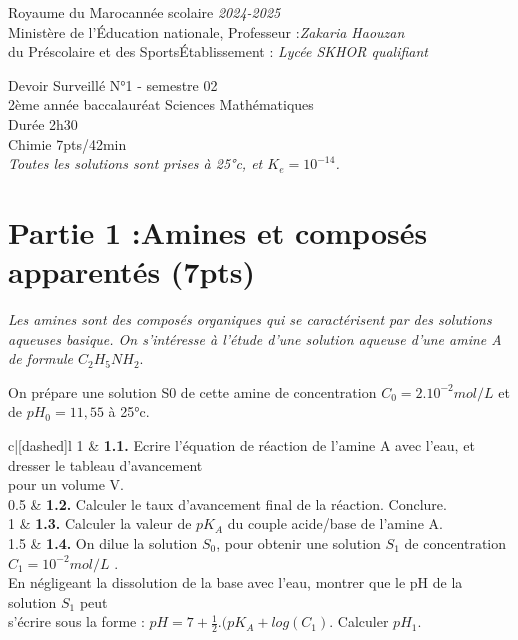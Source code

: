 \documentclass[12pt]{article}
\newcommand\headerMe[2]{\noindent{}#1\hfill#2}
\begin{document}
\headerMe{Royaume du Maroc}{année scolaire \emph{2024-2025}}\\
\headerMe{Ministère de l'Éducation nationale, }{  Professeur :\emph{Zakaria Haouzan}}\\
\headerMe{du Préscolaire et des Sports}{Établissement : \emph{Lycée SKHOR qualifiant}}\\

\begin{center}
Devoir Surveillé  N°1 - semestre 02 \\
    2ème année baccalauréat Sciences Mathématiques\\
Durée 2h30
\\
    \vspace{.2cm}
\hrulefill
\Large{Chimie 7pts/42min}
\hrulefill\\

	\emph{Toutes les solutions sont prises à 25°c, et $K_e=10^{-14}$. }
\end{center}

 \section*{Partie 1 :Amines et composés apparentés \dotfill(7pts) }

 \emph{Les amines sont des composés organiques qui se caractérisent par des solutions
aqueuses basique. On s’intéresse à l’étude d’une solution aqueuse d’une amine A de
formule $C_2H_5NH_2.$ }

On prépare une solution S0 de cette amine de concentration $C_0=2.10^{-2} mol/L$ et de $pH_0=11,55$ à 25°c.

\begin{tblr}{c|[dashed]l}
	1  & {\textbf{1.1. }Ecrire l’équation de réaction de l’amine A avec l’eau, et dresser le tableau
	d’avancement\\pour un volume V.} \\
	0.5  & \textbf{1.2. }Calculer le taux d’avancement final de la réaction. Conclure.\\
	1  & \textbf{1.3. }Calculer la valeur de $pK_A$ du couple acide/base de l’amine A. \\
	1.5  & {\textbf{1.4. }On dilue la solution $S_0$, pour obtenir une solution $S_1$ de concentration
	$C_1=10^{-2} mol/L$ . \\En négligeant la dissolution de la base avec l’eau, montrer que le
	pH de la solution $S_1$ peut\\ s’écrire sous la forme : $pH = 7 + \frac{1}{2}.(pK_A + log(C_1)$.
Calculer $pH_1$. } \\
\end{tblr}
\end{document}

